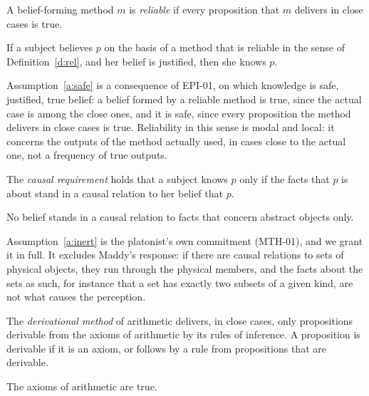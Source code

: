 \documentclass{situationist-preprint}
\begin{document}
\begin{definition}\label{d:rel}
A belief-forming method $m$ is \emph{reliable} if every proposition that $m$ delivers in close cases is true.
\end{definition}

\begin{assumption}\label{a:safe}
If a subject believes $p$ on the basis of a method that is reliable in the sense of Definition~\ref{d:rel}, and her belief is justified, then she knows $p$.
\end{assumption}

Assumption~\ref{a:safe} is a consequence of EPI-01, on which knowledge is safe, justified, true belief: a belief formed by a reliable method is true, since the actual case is among the close ones, and it is safe, since every proposition the method delivers in close cases is true. Reliability in this sense is modal and local: it concerns the outputs of the method actually used, in cases close to the actual one, not a frequency of true outputs.

\begin{definition}\label{d:cr}
The \emph{causal requirement} holds that a subject knows $p$ only if the facts that $p$ is about stand in a causal relation to her belief that $p$.
\end{definition}

\begin{assumption}[Inertness]\label{a:inert}
No belief stands in a causal relation to facts that concern abstract objects only.
\end{assumption}

Assumption~\ref{a:inert} is the platonist's own commitment (MTH-01), and we grant it in full. It excludes Maddy's response: if there are causal relations to sets of physical objects, they run through the physical members, and the facts about the sets as such, for instance that a set has exactly two subsets of a given kind, are not what causes the perception.

\begin{definition}\label{d:deriv}
The \emph{derivational method} of arithmetic delivers, in close cases, only propositions derivable from the axioms of arithmetic by its rules of inference. A proposition is derivable if it is an axiom, or follows by a rule from propositions that are derivable.
\end{definition}

\begin{assumption}[Axioms]\label{a:ax}
The axioms of arithmetic are true.
\end{assumption}
\end{document}
